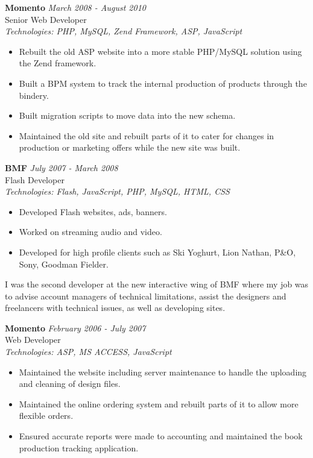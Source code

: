\documentclass[a4paper,10pt]{article}
\begin{document}
\vspace{1em}

\textbf{Momento} \hfill \textit{March 2008 - August 2010} \\
Senior Web Developer \\
\textit{Technologies: PHP, MySQL, Zend Framework, ASP, JavaScript}
\begin{itemize}
    \item Rebuilt the old ASP website into a more stable PHP/MySQL solution using the Zend framework.
    \item Built a BPM system to track the internal production of products through the bindery.
    \item Built migration scripts to move data into the new schema.
    \item Maintained the old site and rebuilt parts of it to cater for changes in production or marketing offers while the new site was built.
\end{itemize}

\vspace{1em}

\textbf{BMF} \hfill \textit{July 2007 - March 2008} \\
Flash Developer \\
\textit{Technologies: Flash, JavaScript, PHP, MySQL, HTML, CSS}
\begin{itemize}
    \item Developed Flash websites, ads, banners.
    \item Worked on streaming audio and video.
    \item Developed for high profile clients such as Ski Yoghurt, Lion Nathan, P\&O, Sony, Goodman Fielder.
\end{itemize}

I was the second developer at the new interactive wing of BMF where my job was to advise account managers of technical limitations, assist the designers and freelancers with technical issues, as well as developing sites.

\vspace{1em}

\textbf{Momento} \hfill \textit{February 2006 - July 2007} \\
Web Developer \\
\textit{Technologies: ASP, MS ACCESS, JavaScript}
\begin{itemize}
    \item Maintained the website including server maintenance to handle the uploading and cleaning of design files.
    \item Maintained the online ordering system and rebuilt parts of it to allow more flexible orders.
    \item Ensured accurate reports were made to accounting and maintained the book production tracking application.
\end{itemize}
\end{document}
